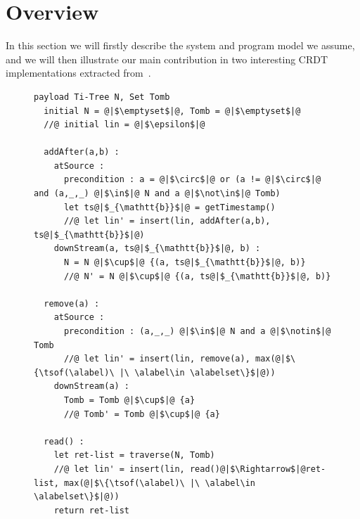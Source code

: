 \section{Overview}
\label{sec:overview}

In this section we will firstly describe the system and program model
we assume, and we will then illustrate our main contribution in two
interesting CRDT implementations extracted from~\cite{ShapiroPBZ11}.

\begin{figure}[t]
\begin{lstlisting}[caption={Replicated Growing Array (RGA) CRDT pseudo-code (adapted from~\cite{ShapiroPBZ11})},captionpos=b,label={lst:rga}]
  payload Ti-Tree N, Set Tomb
  initial N = @|$\emptyset$|@, Tomb = @|$\emptyset$|@
  //@ initial lin = @|$\epsilon$|@

  addAfter(a,b) :
    atSource :
      precondition : a = @|$\circ$|@ or (a != @|$\circ$|@ and (a,_,_) @|$\in$|@ N and a @|$\not\in$|@ Tomb)
      let ts@|$_{\mathtt{b}}$|@ = getTimestamp()
      //@ let lin' = insert(lin, addAfter(a,b), ts@|$_{\mathtt{b}}$|@)
    downStream(a, ts@|$_{\mathtt{b}}$|@, b) :
      N = N @|$\cup$|@ {(a, ts@|$_{\mathtt{b}}$|@, b)}
      //@ N' = N @|$\cup$|@ {(a, ts@|$_{\mathtt{b}}$|@, b)}

  remove(a) :
    atSource :
      precondition : (a,_,_) @|$\in$|@ N and a @|$\notin$|@ Tomb
      //@ let lin' = insert(lin, remove(a), max(@|$\{\tsof(\alabel)\ |\ \alabel\in \alabelset\}$|@))
    downStream(a) :
      Tomb = Tomb @|$\cup$|@ {a}
      //@ Tomb' = Tomb @|$\cup$|@ {a}

  read() :
    let ret-list = traverse(N, Tomb)
    //@ let lin' = insert(lin, read()@|$\Rightarrow$|@ret-list, max(@|$\{\tsof(\alabel)\ |\ \alabel\in \alabelset\}$|@))
    return ret-list
\end{lstlisting}
\end{figure}

